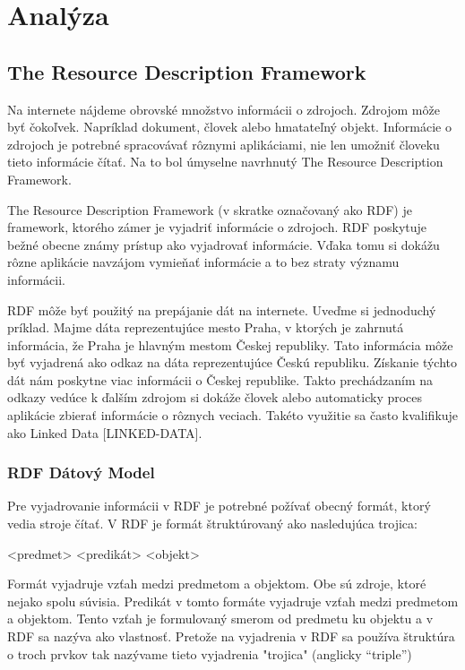 
\chapter{Analýza}

\section{The Resource Description Framework}

Na internete nájdeme obrovské množstvo informácii o zdrojoch. Zdrojom môže byť čokoľvek. Napríklad dokument, človek alebo hmatateľný objekt.
Informácie o zdrojoch je potrebné spracovávať rôznymi aplikáciami, nie len umožniť človeku tieto informácie čítať. Na to bol úmyselne navrhnutý
The Resource Description Framework.

The Resource Description Framework (v skratke označovaný ako RDF) je framework, ktorého zámer je vyjadriť informácie o zdrojoch. RDF poskytuje bežné obecne známy
prístup ako vyjadrovať informácie. Vďaka tomu si dokážu rôzne aplikácie navzájom vymieňať
informácie a to bez straty významu informácii.

RDF môže byť použitý na prepájanie dát na internete. Uveďme si jednoduchý príklad.
Majme dáta reprezentujúce mesto Praha, v ktorých je zahrnutá informácia, že Praha je hlavným mestom
Českej republiky. Tato informácia môže byť vyjadrená ako odkaz na dáta reprezentujúce
Českú republiku. Získanie týchto dát nám poskytne viac informácii o Českej republike. Takto prechádzaním na odkazy vedúce k ďalším zdrojom si dokáže človek alebo automaticky proces
aplikácie zbierať informácie o rôznych veciach. Takéto využitie sa často kvalifikuje ako
Linked Data [LINKED-DATA].

\subsection{RDF Dátový Model }

Pre vyjadrovanie informácii v RDF je potrebné požívať obecný formát,
ktorý vedia stroje čítať. V RDF je formát štruktúrovaný ako nasledujúca trojica:

\begin{code}
    <predmet> <predikát> <objekt>
\end{code}

Formát vyjadruje vzťah medzi predmetom a objektom. Obe sú zdroje, ktoré
nejako spolu súvisia. Predikát v tomto formáte vyjadruje vzťah medzi predmetom a objektom.
Tento vzťah je formulovaný smerom od predmetu ku objektu a v RDF sa nazýva ako vlastnosť.
Pretože na vyjadrenia v RDF sa používa štruktúra o troch prvkov tak nazývame tieto vyjadrenia "trojica" (anglicky “triple”)


